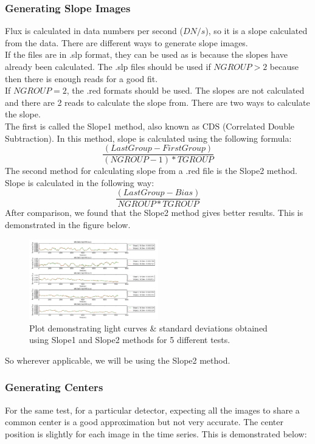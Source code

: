 \documentclass[conference]{IEEEtran}
\begin{document}
        \subsubsection{Generating Slope Images}
        Flux is calculated in data numbers per second ($DN/s$), so it is a slope calculated from the data. There are different ways to generate slope images.\\
        If the files are in .slp format, they can be used as is because the slopes have already been calculated. The .slp files should be used if $NGROUP > 2$ because then there is enough reads for a good fit.\\
        If $NGROUP = 2$, the .red formats should be used. The slopes are not calculated and there are 2 reads to calculate the slope from. There are two ways to calculate the slope.\\
        The first is called the Slope1 method, also known as CDS (Correlated Double Subtraction). In this method, slope is calculated using the following formula:
        $$\frac{(Last Group - First Group)}{(NGROUP-1)*TGROUP}$$
        The second method for calculating slope from a .red file is the Slope2 method. Slope is calculated in the following way:
        $$\frac{(Last Group - Bias)}{NGROUP*TGROUP}$$
        After comparison, we found that the Slope2 method gives better results. This is demonstrated in the figure below.
        \begin{figure}[H]
            \includegraphics[width=0.5\textwidth]{Slopes}
            \caption{Plot demonstrating light curves \& standard deviations obtained using Slope1 and Slope2 methods for 5 different tests.}
            \label{fig:slopes}
        \end{figure}
        So wherever applicable, we will be using the Slope2 method.   
        
        \subsubsection{Generating Centers}
        For the same test, for a particular detector, expecting all the images to share a common center is a good approximation but not very accurate. The center position is slightly for each image in the time series. This is demonstrated below:
        
\end{document}
